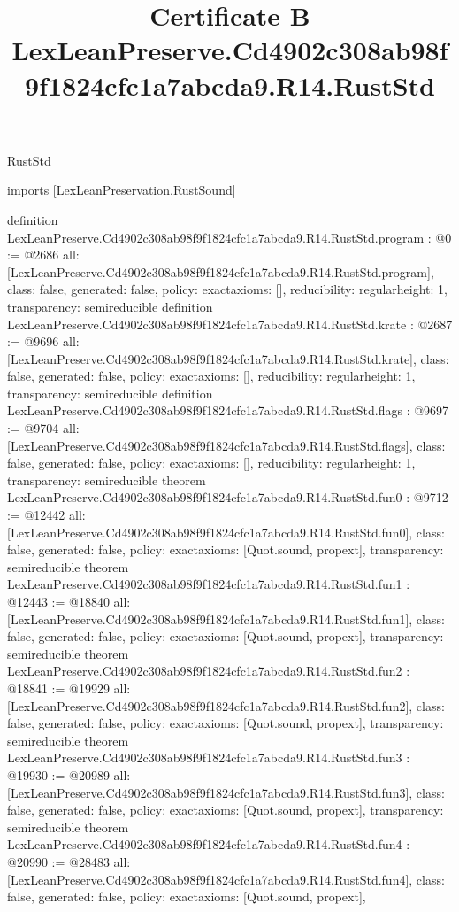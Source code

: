 \begin{lexlean}{RustStd}
\title{Certificate B LexLeanPreserve.Cd4902c308ab98f9f1824cfc1a7abcda9.R14.RustStd}
\begin{coremodule}
imports [LexLeanPreservation.RustSound]

definition LexLeanPreserve.Cd4902c308ab98f9f1824cfc1a7abcda9.R14.RustStd.program : @0 := @2686 {
  all: [LexLeanPreserve.Cd4902c308ab98f9f1824cfc1a7abcda9.R14.RustStd.program],
  class: false,
  generated: false,
  policy: exact{axioms: []},
  reducibility: regular{height: 1},
  transparency: semireducible
}
definition LexLeanPreserve.Cd4902c308ab98f9f1824cfc1a7abcda9.R14.RustStd.krate : @2687 := @9696 {
  all: [LexLeanPreserve.Cd4902c308ab98f9f1824cfc1a7abcda9.R14.RustStd.krate],
  class: false,
  generated: false,
  policy: exact{axioms: []},
  reducibility: regular{height: 1},
  transparency: semireducible
}
definition LexLeanPreserve.Cd4902c308ab98f9f1824cfc1a7abcda9.R14.RustStd.flags : @9697 := @9704 {
  all: [LexLeanPreserve.Cd4902c308ab98f9f1824cfc1a7abcda9.R14.RustStd.flags],
  class: false,
  generated: false,
  policy: exact{axioms: []},
  reducibility: regular{height: 1},
  transparency: semireducible
}
theorem LexLeanPreserve.Cd4902c308ab98f9f1824cfc1a7abcda9.R14.RustStd.fun0 : @9712 := @12442 {
  all: [LexLeanPreserve.Cd4902c308ab98f9f1824cfc1a7abcda9.R14.RustStd.fun0],
  class: false,
  generated: false,
  policy: exact{axioms: [Quot.sound, propext]},
  transparency: semireducible
}
theorem LexLeanPreserve.Cd4902c308ab98f9f1824cfc1a7abcda9.R14.RustStd.fun1 : @12443 := @18840 {
  all: [LexLeanPreserve.Cd4902c308ab98f9f1824cfc1a7abcda9.R14.RustStd.fun1],
  class: false,
  generated: false,
  policy: exact{axioms: [Quot.sound, propext]},
  transparency: semireducible
}
theorem LexLeanPreserve.Cd4902c308ab98f9f1824cfc1a7abcda9.R14.RustStd.fun2 : @18841 := @19929 {
  all: [LexLeanPreserve.Cd4902c308ab98f9f1824cfc1a7abcda9.R14.RustStd.fun2],
  class: false,
  generated: false,
  policy: exact{axioms: [Quot.sound, propext]},
  transparency: semireducible
}
theorem LexLeanPreserve.Cd4902c308ab98f9f1824cfc1a7abcda9.R14.RustStd.fun3 : @19930 := @20989 {
  all: [LexLeanPreserve.Cd4902c308ab98f9f1824cfc1a7abcda9.R14.RustStd.fun3],
  class: false,
  generated: false,
  policy: exact{axioms: [Quot.sound, propext]},
  transparency: semireducible
}
theorem LexLeanPreserve.Cd4902c308ab98f9f1824cfc1a7abcda9.R14.RustStd.fun4 : @20990 := @28483 {
  all: [LexLeanPreserve.Cd4902c308ab98f9f1824cfc1a7abcda9.R14.RustStd.fun4],
  class: false,
  generated: false,
  policy: exact{axioms: [Quot.sound, propext]},
}
\end{coremodule}
\end{lexlean}
